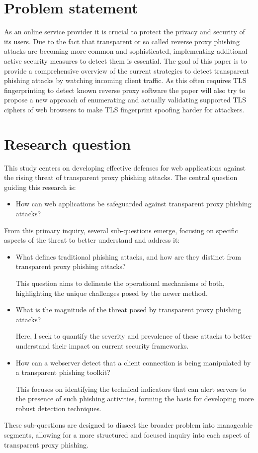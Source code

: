 \documentclass[12pt]{scrbook}
\begin{document}
\newpage \section{Problem statement} As an online service provider
it is crucial to protect the privacy and security of its users. Due to the
fact that transparent or so called reverse proxy phishing attacks are
becoming more common and sophisticated, implementing additional active
security measures to detect them is essential. The goal of this paper is to
provide a comprehensive overview of the current strategies to detect
transparent phishing attacks by watching incoming client traffic. As this
often requires TLS fingerprinting to detect known reverse proxy software the
paper will also try to propose a new approach of enumerating and actually
validating supported TLS ciphers of web browsers to make TLS fingerprint
spoofing harder for attackers.

\section{Research question}
This study centers on developing effective defenses for web applications against the rising threat of transparent proxy phishing attacks. The central question guiding this research is:
\begin{itemize}
    \item How can web applications be safeguarded against transparent proxy phishing attacks?
\end{itemize}
From this primary inquiry, several sub-questions emerge, focusing on specific aspects of the threat to better understand and address it:
\begin{itemize}
    \item What defines traditional phishing attacks, and how are they distinct from transparent proxy phishing attacks?

    This question aims to delineate the operational mechanisms of both, highlighting the unique challenges posed by the newer method.
    \item What is the magnitude of the threat posed by transparent proxy phishing attacks?

    Here, I seek to quantify the severity and prevalence of these attacks to better understand their impact on current security frameworks.
    \item How can a webserver detect that a client connection is being manipulated by a transparent phishing toolkit?

    This focuses on identifying the technical indicators that can alert servers to the presence of such phishing activities, forming the basis for developing more robust detection techniques.
\end{itemize}
These sub-questions are designed to dissect the broader problem into manageable segments, allowing for a more structured and focused inquiry into each aspect of transparent proxy phishing.
\end{document}
